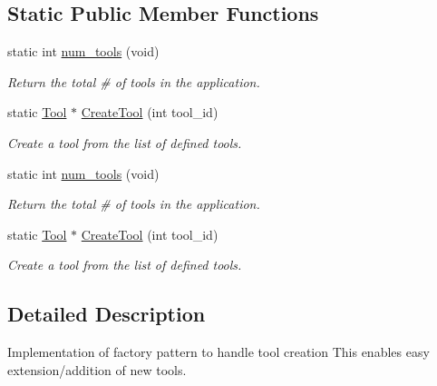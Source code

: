\subsection*{Static Public Member Functions}
\begin{DoxyCompactItemize}
\item 
static int \hyperlink{classimage__tools_1_1ToolFactory_a365cd7d26afa67a4d5b2e730f585df90}{num\+\_\+tools} (void)\hypertarget{classimage__tools_1_1ToolFactory_a365cd7d26afa67a4d5b2e730f585df90}{}\label{classimage__tools_1_1ToolFactory_a365cd7d26afa67a4d5b2e730f585df90}

\begin{DoxyCompactList}\small\item\em Return the total \# of tools in the application. \end{DoxyCompactList}\item 
static \hyperlink{classimage__tools_1_1Tool}{Tool} $\ast$ \hyperlink{classimage__tools_1_1ToolFactory_a2f5d6b0cc72bc3aff97e6eaba5182a00}{Create\+Tool} (int tool\+\_\+id)
\begin{DoxyCompactList}\small\item\em Create a tool from the list of defined tools. \end{DoxyCompactList}\item 
static int \hyperlink{classimage__tools_1_1ToolFactory_a365cd7d26afa67a4d5b2e730f585df90}{num\+\_\+tools} (void)\hypertarget{classimage__tools_1_1ToolFactory_a365cd7d26afa67a4d5b2e730f585df90}{}\label{classimage__tools_1_1ToolFactory_a365cd7d26afa67a4d5b2e730f585df90}

\begin{DoxyCompactList}\small\item\em Return the total \# of tools in the application. \end{DoxyCompactList}\item 
static \hyperlink{classimage__tools_1_1Tool}{Tool} $\ast$ \hyperlink{classimage__tools_1_1ToolFactory_ab33c1be30f8bb35c481fa534300d393c}{Create\+Tool} (int tool\+\_\+id)
\begin{DoxyCompactList}\small\item\em Create a tool from the list of defined tools. \end{DoxyCompactList}\end{DoxyCompactItemize}


\subsection{Detailed Description}
Implementation of factory pattern to handle tool creation This enables easy extension/addition of new tools. 

